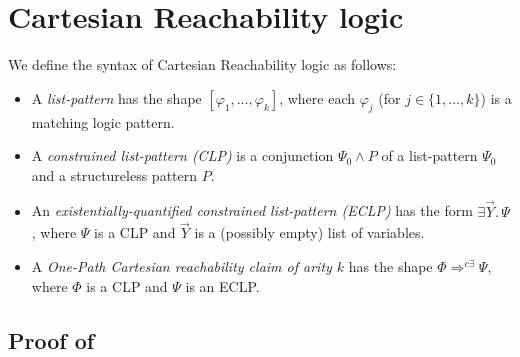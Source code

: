 \section{Cartesian Reachability logic}

\begin{definition}\label{def:opCRLSyntax}
    We define the syntax of Cartesian Reachability logic as follows:
    \begin{itemize}
        \item 
    A \emph{list-pattern} has the shape $[\varphi_1,\ldots,\varphi_k]$,
              where each $\varphi_j$ (for $j \in \{ 1, \ldots, k \} $) is a matching logic pattern.
        \item
              A \emph{constrained list-pattern (CLP)} is a conjunction $\Psi_0 \land P$
              of a list-pattern $\Psi_0$ and a structureless pattern $P$.
        \item
              An \emph{existentially-quantified constrained list-pattern (ECLP)} has the form
              $\exists \vec{Y}.\, \Psi$, where $\Psi$ is a CLP and $\vec{Y}$ is a (possibly empty) list of variables.
        \item
              A \emph{One-Path Cartesian reachability claim of arity $k$} has the shape
              $\Phi \Rightarrow^{c\exists} \Psi$,
              where $\Phi$ is a CLP and $\Psi$ is an ECLP.
    \end{itemize}
\end{definition}    

\subsection{Proof of~}\label{app:CRLandRLcorrespondence}

